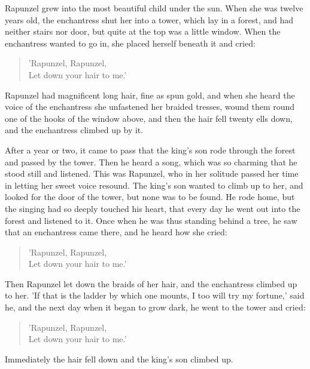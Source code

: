 \documentclass[12pt]{book}
\begin{document}
Rapunzel grew into the most beautiful child under the sun. When she
was twelve years old, the enchantress shut her into a tower, which lay
in a forest, and had neither stairs nor door, but quite at the top was
a little window. When the enchantress wanted to go in, she placed
herself beneath it and cried:

\begin{verse}
 'Rapunzel, Rapunzel,\\
  Let down your hair to me.'
\end{verse}

Rapunzel had magnificent long hair, fine as spun gold, and when she
heard the voice of the enchantress she unfastened her braided tresses,
wound them round one of the hooks of the window above, and then the
hair fell twenty ells down, and the enchantress climbed up by it.

After a year or two, it came to pass that the king's son rode through
the forest and passed by the tower. Then he heard a song, which was so
charming that he stood still and listened. This was Rapunzel, who in
her solitude passed her time in letting her sweet voice resound. The
king's son wanted to climb up to her, and looked for the door of the
tower, but none was to be found. He rode home, but the singing had so
deeply touched his heart, that every day he went out into the forest
and listened to it. Once when he was thus standing behind a tree, he
saw that an enchantress came there, and he heard how she cried:

\begin{verse}
 'Rapunzel, Rapunzel,\\
  Let down your hair to me.'
\end{verse}

Then Rapunzel let down the braids of her hair, and the enchantress
climbed up to her. 'If that is the ladder by which one mounts, I too
will try my fortune,' said he, and the next day when it began to grow
dark, he went to the tower and cried:

\begin{verse}
 'Rapunzel, Rapunzel,\\
  Let down your hair to me.'
\end{verse}

Immediately the hair fell down and the king's son climbed up.
\end{document}
